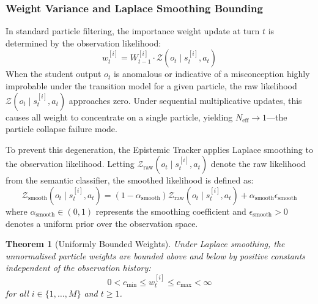 \documentclass[11pt,a4paper]{report}
\newtheorem{theorem}{Theorem}
\begin{document}
\subsubsection{Weight Variance and Laplace Smoothing Bounding}
In standard particle filtering, the importance weight update at turn $t$ is determined by the observation likelihood:
\begin{equation}
    w_t^{[i]} = W_{t-1}^{[i]} \cdot \mathcal{Z}(o_t \mid s_t^{[i]}, a_t)
\end{equation}
When the student output $o_t$ is anomalous or indicative of a misconception highly improbable under the transition model for a given particle, the raw likelihood $\mathcal{Z}(o_t \mid s_t^{[i]}, a_t)$ approaches zero. Under sequential multiplicative updates, this causes all weight to concentrate on a single particle, yielding $N_{\text{eff}} \to 1$---the particle collapse failure mode.

To prevent this degeneration, the Epistemic Tracker applies Laplace smoothing to the observation likelihood. Letting $\mathcal{Z}_{\text{raw}}(o_t \mid s_t^{[i]}, a_t)$ denote the raw likelihood from the semantic classifier, the smoothed likelihood is defined as:
\begin{equation}
    \mathcal{Z}_{\text{smooth}}(o_t \mid s_t^{[i]}, a_t) = (1 - \alpha_{\text{smooth}}) \mathcal{Z}_{\text{raw}}(o_t \mid s_t^{[i]}, a_t) + \alpha_{\text{smooth}} \epsilon_{\text{smooth}}
\end{equation}
where $\alpha_{\text{smooth}} \in (0, 1)$ represents the smoothing coefficient and $\epsilon_{\text{smooth}} > 0$ denotes a uniform prior over the observation space. 

\begin{theorem}[Uniformly Bounded Weights]
Under Laplace smoothing, the unnormalised particle weights are bounded above and below by positive constants independent of the observation history:
\begin{equation}
    0 < c_{\text{min}} \le w_t^{[i]} \le c_{\text{max}} < \infty
\end{equation}
for all $i \in \{1, \dots, M\}$ and $t \ge 1$.
\end{theorem}
\end{document}
